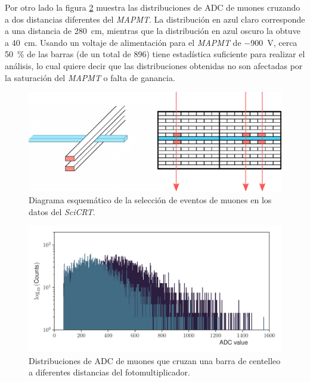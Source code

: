 Por otro lado la figura \ref{fig:adc-distance} muestra las distribuciones de ADC de muones cruzando a dos distancias diferentes del \emph{MAPMT}. La distribución en azul claro corresponde a una distancia de \SI{280}{\cm}, mientras que la distribución en azul oscuro la obtuve a \SI{40}{\cm}. Usando un voltaje de alimentación para el \emph{MAPMT} de \SI{-900}{\volt}, cerca \SI{50}{\percent} de las barras (de un total de \num{896}) tiene estadística suficiente para realizar el análisis, lo cual quiere decir que las distribuciones obtenidas no son afectadas por la saturación del \emph{MAPMT} o falta de ganancia.

\begin{figure}
        \centering
        \includegraphics[width=\textwidth]{muon-attenuation.pdf}
        \caption{Diagrama esquemático de la selección de eventos de muones en los datos del \emph{SciCRT}.}
        \label{fig:muon-selection}
\end{figure}

\begin{figure}
        \centering
        \includegraphics[width=\textwidth]{adc_attenuation.pdf}
        \caption{Distribuciones de ADC de muones que cruzan una barra de centelleo a diferentes distancias del fotomultiplicador.}
        \label{fig:adc-distance}
\end{figure}

